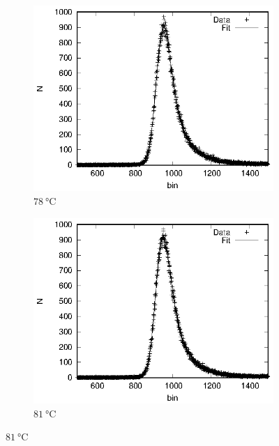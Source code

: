 \begin{figure}[h]
\begin{subfigure}[h]{0.49\textwidth}
    \includegraphics[width=\textwidth]{evaluation_kilian/temp/na_78.eps}
    \caption{$\SI{78}{\celsius}$}
  \end{subfigure}
  \begin{subfigure}[h]{0.49\textwidth}
    \centering
    \includegraphics[width=\textwidth]{evaluation_kilian/temp/na_81.eps}
    \caption{$\SI{81}{\celsius}$}
  \end{subfigure}
  \end{figure}
